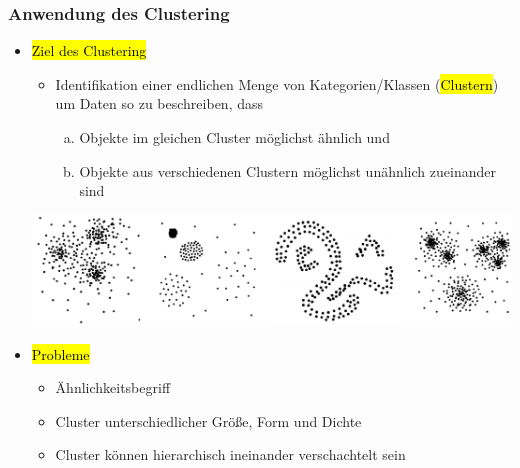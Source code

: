 \begin{frame}%
\frametitle{Anwendung des Clustering}

\begin{itemize}
\item \hl{Ziel des Clustering}
\begin{itemize}
\item Identifikation einer endlichen Menge von Kategorien/Klassen
  (\hl{Clustern}) um Daten so zu beschreiben, dass
\begin{enumerate}[(a)]
\item Objekte im gleichen Cluster möglichst ähnlich und
\item Objekte aus verschiedenen Clustern möglichst unähnlich zueinander sind
\end{enumerate}

\end{itemize}

\begin{center}
\includegraphics[scale=.4]{fig7/cluster-formen.pdf}
\end{center}

\item \hl{Probleme}
\begin{itemize}
\item Ähnlichkeitsbegriff
\item Cluster unterschiedlicher Größe, Form und Dichte
\item Cluster können hierarchisch ineinander verschachtelt sein
\end{itemize}
\end{itemize}
\end{frame}



